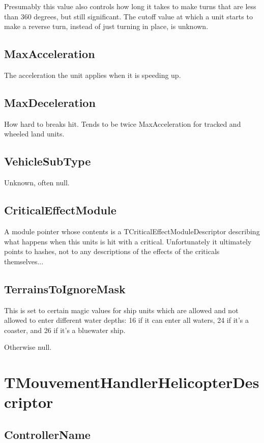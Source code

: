 \documentclass{article}
\begin{document}
Presumably this value also controls how long it takes to make turns that are less than 360 degrees, but still significant. The cutoff value at which a unit starts to make a reverse turn, instead of just turning in place, is unknown.

\subsection{MaxAcceleration}

The acceleration the unit applies when it is speeding up.

\subsection{MaxDeceleration}

How hard to breaks hit. Tends to be twice MaxAcceleration for tracked and wheeled land units.

\subsection{VehicleSubType}

Unknown, often null.

\subsection{CriticalEffectModule}

A module pointer whose contents is a TCriticalEffectModuleDescriptor describing what happens when this units is hit with a critical. Unfortunately it ultimately points to hashes, not to any descriptions of the effects of the criticals themselves...

\subsection{TerrainsToIgnoreMask}

This is set to certain magic values for ship units which are allowed and not allowed to enter different water depths: 16 if it can enter all waters, 24 if it's a coaster, and 26 if it's a bluewater ship.

Otherwise null.

\section{TMouvementHandlerHelicopterDescriptor}

\subsection{ControllerName}
\end{document}
